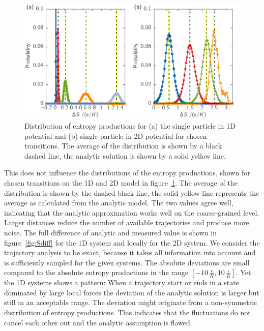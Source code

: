 \begin{figure}[t]
\centering
 \includegraphics{../plots/Complementary/Shist.pdf}
 \caption[Distribution of entropy productions for the single particle in 1D potential and single particle in 2D potential for chosen transitions. ]{Distribution of entropy productions for (a) the single particle in 1D potential and (b) single particle in 2D potential for chosen transitions. The average of the distribution is shown by a black dashed line, the analytic solution is shown by a solid yellow line. }
 \label{fig:Shist}
\end{figure}
This does not influence the distributions of the entropy productions, shown for chosen transitions on the 1D and 2D model in figure~\ref{fig:Shist}.  The average of the distribution is shown by the dashed black line, the solid yellow line represents the average as calculated from the analytic model. The two values agree well, indicating that the analytic approximation works well on the coarse-grained level. Larger distances reduce the number of available trajectories and produce more noise. The full difference of analytic and measured value is shown in figure~\ref{fig:Sdiff} for the 1D system and locally for the 2D system.  We consider the trajectory analysis to be exact, because it takes all information into account and is sufficiently sampled for the given systems. The absolute deviations are small compared to the absolute entropy productions in the range $[-10\,\frac{\epsilon}{K},10\,\frac{\epsilon}{K}]$. Yet the 1D systems shows a pattern: When a trajectory start or ends in a state dominated by large local forces the deviation of the analytic solution is larger but still in an acceptable range. The deviation might originate from a non-symmetric distribution of entropy productions. This indicates that the fluctuations do not cancel each other out and the analytic assumption is flawed.  

